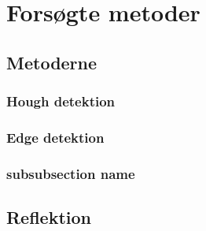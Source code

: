 \section{Forsøgte metoder} %
\subsection{Metoderne}	   %
\subsubsection{Hough detektion}
\subsubsection{Edge detektion}
\subsubsection{subsubsection name}
\subsection{Reflektion}    %